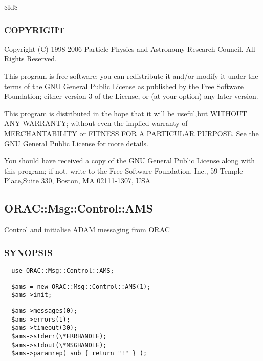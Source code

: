 \$Id\$

\subsubsection*{COPYRIGHT\label{ORAC::Loop_COPYRIGHT}}


Copyright (C) 1998-2006 Particle Physics and Astronomy Research
Council. All Rights Reserved.



This program is free software; you can redistribute it and/or modify it under
the terms of the GNU General Public License as published by the Free Software
Foundation; either version 3 of the License, or (at your option) any later
version.



This program is distributed in the hope that it will be useful,but WITHOUT ANY
WARRANTY; without even the implied warranty of MERCHANTABILITY or FITNESS FOR A
PARTICULAR PURPOSE. See the GNU General Public License for more details.



You should have received a copy of the GNU General Public License along with
this program; if not, write to the Free Software Foundation, Inc., 59 Temple
Place,Suite 330, Boston, MA  02111-1307, USA

\subsection{ORAC::Msg::Control::AMS\label{ORAC::Msg::Control::AMS}}


Control and initialise ADAM messaging from ORAC

\subsubsection*{SYNOPSIS\label{ORAC::Msg::Control::AMS_SYNOPSIS}}
\begin{verbatim}
  use ORAC::Msg::Control::AMS;
\end{verbatim}
\begin{verbatim}
  $ams = new ORAC::Msg::Control::AMS(1);
  $ams->init;
\end{verbatim}
\begin{verbatim}
  $ams->messages(0);
  $ams->errors(1);
  $ams->timeout(30);
  $ams->stderr(\*ERRHANDLE);
  $ams->stdout(\*MSGHANDLE);
  $ams->paramrep( sub { return "!" } );
\end{verbatim}
